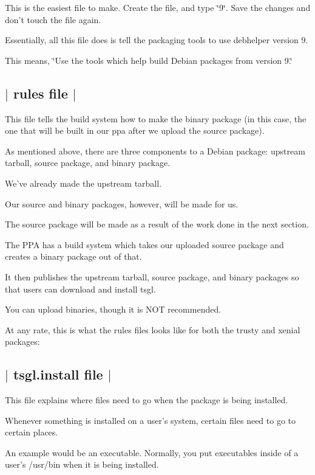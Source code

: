 This is the easiest file to make. Create the file, and type \char`\"{}9\char`\"{}. Save the changes and don't touch the file again.

Essentially, all this file does is tell the packaging tools to use debhelper version 9.

This means, \char`\"{}\-Use the tools which help build Debian packages from version 9.\char`\"{} 

 \subsection*{$\vert$ rules file $\vert$ }

This file tells the build system how to make the binary package (in this case, the one that will be built in our ppa after we upload the source package).

As mentioned above, there are three components to a Debian package\-: upstream tarball, source package, and binary package.

We've already made the upstream tarball.

Our source and binary packages, however, will be made for us.

The source package will be made as a result of the work done in the next section.

The P\-P\-A has a build system which takes our uploaded source package and creates a binary package out of that.

It then publishes the upstream tarball, source package, and binary packages so that users can download and install tsgl.

You can upload binaries, though it is N\-O\-T recommended.

At any rate, this is what the rules files looks like for both the trusty and xenial packages\-:



 \subsection*{$\vert$ tsgl.\-install file $\vert$ }

This file explains where files need to go when the package is being installed.

Whenever something is installed on a user's system, certain files need to go to certain places.

An example would be an executable. Normally, you put executables inside of a user's /usr/bin when it is being installed.

